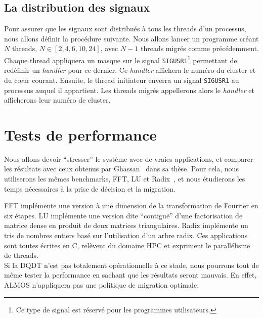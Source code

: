     \subsection{La distribution des signaux}

      Pour assurer que les signaux sont distribués à tous les threads d'un
      processus, nous allons définir la procédure suivante. Nous allons lancer
      un programme créant $N$ threads, $N \in [2, 4, 6, 10, 24]$, avec $N-1$
      threads migrés comme précédemment. Chaque thread appliquera un masque sur
      le signal \texttt{SIGUSR1}\footnote{Ce type de signal est réservé pour les
        programmes utilisateurs.} permettant de redéfinir un \textit{handler}
      pour ce dernier. Ce \textit{handler} affichera le numéro du cluster et du
      c\oe ur courant. Ensuite, le thread initiateur enverra un signal
      \texttt{SIGUSR1} au processus auquel il appartient. Les threads migrés
      appellerons alors le \textit{handler} et afficherons leur numéro de
      cluster.


  \section{Tests de performance}
  \label{sec:dqdt-test}

    Nous allons devoir ``stresser'' le système avec de vraies applications, et
    comparer les résultats avec ceux obtenus par
    Ghassan~\citeauthor{almaless2014universite} dans sa thèse. Pour cela, nous
    utiliserons les mêmes benchmarks, FFT, LU et Radix~\citep{bailey1989ffts,
      woo1994performance, blelloch1991comparison}, et nous étudierons les temps
    nécessaires à la prise de décision et la migration.

    FFT implémente une version à une dimension de la transformation de Fourrier
    en six étapes. LU implémente une version dite ``contiguë'' d’une
    factorisation de matrice dense en produit de deux matrices
    triangulaires. Radix implémente un tris de nombres entiers basé sur
    l’utilisation d’un arbre radix. Ces applications sont toutes écrites en C,
    relèvent du domaine HPC et expriment le parallélisme de threads.\\

    Si la DQDT n'est pas totalement opérationnelle à ce stade, nous pourrons
    tout de même tester la performance en sachant que les résultats seront
    mauvais. En effet, ALMOS n'appliquera pas une politique de migration
    optimale.

